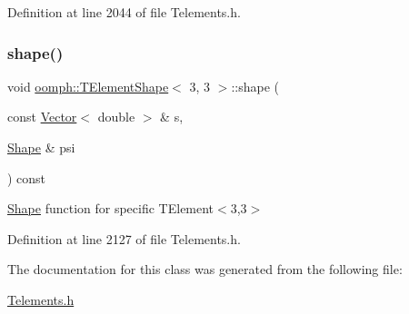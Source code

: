 Definition at line 2044 of file Telements.\+h.

\mbox{\label{classoomph_1_1TElementShape_3_013_00_013_01_4_a1bfc7a56eec9e2ce91f5e50e07a54a10}} 
\subsubsection{\texorpdfstring{shape()}{shape()}}
{\footnotesize\ttfamily void \hyperlink{classoomph_1_1TElementShape}{oomph\+::\+T\+Element\+Shape}$<$ 3, 3 $>$\+::shape (\begin{DoxyParamCaption}\item[{const \hyperlink{classoomph_1_1Vector}{Vector}$<$ double $>$ \&}]{s,  }\item[{\hyperlink{classoomph_1_1Shape}{Shape} \&}]{psi }\end{DoxyParamCaption}) const\hspace{0.3cm}{\ttfamily [inline]}}



\hyperlink{classoomph_1_1Shape}{Shape} function for specific T\+Element$<$3,3$>$ 



Definition at line 2127 of file Telements.\+h.



The documentation for this class was generated from the following file\+:\begin{DoxyCompactItemize}
\item 
\hyperlink{Telements_8h}{Telements.\+h}\end{DoxyCompactItemize}
